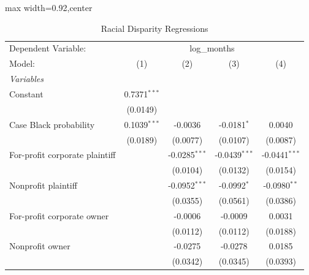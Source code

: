 
\begin{table}[htbp]
   \caption{\label{tab:backrent_race} Racial Disparity Regressions}
   \centering
   \scriptsize
   \begin{adjustbox}{max width=0.92\textwidth,center}
      \begin{tabular}{lcccc}
         \tabularnewline \midrule \midrule
         Dependent Variable: & \multicolumn{4}{c}{log\_months}\\
         Model:                                        & (1)            & (2)             & (3)             & (4)\\  
         \midrule
         \emph{Variables}\\
         Constant                                      & 0.7371$^{***}$ &                 &                 &   \\   
                                                       & (0.0149)       &                 &                 &   \\   
         Case Black probability                        & 0.1039$^{***}$ & -0.0036         & -0.0181$^{*}$   & 0.0040\\   
                                                       & (0.0189)       & (0.0077)        & (0.0107)        & (0.0087)\\   
         For-profit corporate plaintiff                &                & -0.0285$^{***}$ & -0.0439$^{***}$ & -0.0441$^{***}$\\   
                                                       &                & (0.0104)        & (0.0132)        & (0.0154)\\   
         Nonprofit plaintiff                           &                & -0.0952$^{***}$ & -0.0992$^{*}$   & -0.0980$^{**}$\\   
                                                       &                & (0.0355)        & (0.0561)        & (0.0386)\\   
         For-profit corporate owner                    &                & -0.0006         & -0.0009         & 0.0031\\   
                                                       &                & (0.0112)        & (0.0112)        & (0.0188)\\   
         Nonprofit owner                               &                & -0.0275         & -0.0278         & 0.0185\\   
                                                       &                & (0.0342)        & (0.0345)        & (0.0393)\\   

\end{tabular}
\end{adjustbox}
\end{table}
